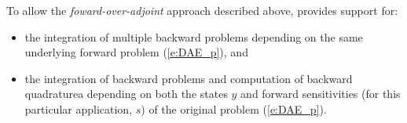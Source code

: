 \bigskip

To allow the {\em foward-over-adjoint} approach described above, {\idas} provides support for:
\begin{itemize}
\item the integration of multiple backward problems depending on the same
  underlying forward problem (\ref{e:DAE_p}), and
\item the integration of backward problems and computation of backward quadraturea
  depending on both the states $y$ and forward sensitivities (for this particular 
  application, $s$) of the original problem (\ref{e:DAE_p}).
\end{itemize}
